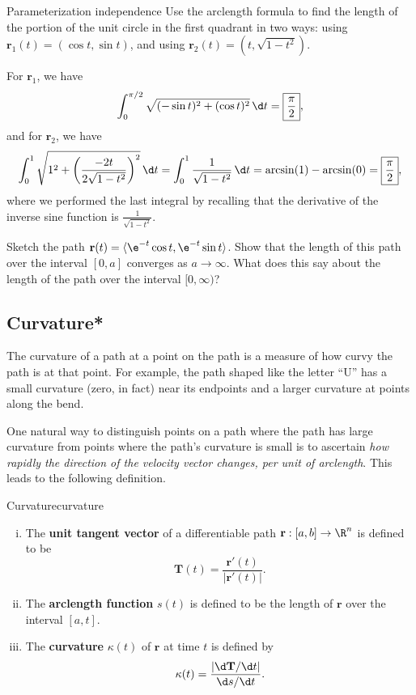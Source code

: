 \documentclass{watsonbook}
\begin{document}
\begin{example}{Parameterization independence}{}
  Use the arclength formula to find the length of the portion of the
  unit circle in the first quadrant in two ways: using $\mathbf{r}_1(t)
  = (\cos t, \sin t)$, and using $\mathbf{r}_2(t) = (t,\sqrt{1-t^2})$. 
\end{example}

\begin{solution}
  For $\mathbf{r}_1$, we have 
  \[
    \int_0^{\pi/2} \sqrt{(-\sin t)^2 + (\cos t)^2} \, \d t = \boxed{\frac{\pi}{2}}, 
  \]
  and for $\mathbf{r}_2$, we have
  \[
    \int_0^1 \sqrt{1^2 + \left(\frac{-2t}{2\sqrt{1-t^2}}\right)^2}\, \d
    t =  \int_0^1 \frac{1}{\sqrt{1-t^2}} \, \d t = \arcsin(1) -
    \arcsin(0) = \boxed{\frac{\pi}{2}}, 
  \]
  where we performed the last integral by recalling that the
  derivative of the inverse sine function is
  $\frac{1}{\sqrt{1-t^2}}$. 
\end{solution}

\begin{exercise}{}{}
  Sketch the path
  $\mathbf{r}(t) = \langle \e^{-t} \cos t, \e^{-t} \sin t \rangle$. Show
  that the length of this path over the interval $[0,a]$ converges as
  $a\to\infty$. What does this say about the length of the path over
  the interval $[0,\infty)$?
\end{exercise}

\subsection{Curvature*} 

The curvature of a path at a point on the path is a measure of how
curvy the path is at that point. For example, the path shaped like the
letter ``\textsf{U}'' has a small curvature (zero, in fact) near its
endpoints and a larger curvature at points along the bend.

One natural way to distinguish points on a path where the path has
large curvature from points where the path's curvature is small is to
ascertain \textit{how rapidly the direction of the velocity vector
  changes, per unit of arclength}. This leads to the following
definition.

\begin{defn}[breakable]{Curvature}{curvature}
  \begin{enumerate}[(i),leftmargin=12pt,topsep=-6pt,itemsep=4pt]
  \item The \textbf{unit tangent vector} of a differentiable path $\mathbf{r}:[a,b]
    \to \R^n$ is defined to be
    \[
      \mathbf{T}(t) = \frac{\mathbf{r}'(t)}{|\mathbf{r}'(t)|}. 
    \]
  \item The \textbf{arclength function} $s(t)$ is defined to be the length
    of $\mathbf{r}$ over the interval $[a,t]$.
  \item The \textbf{curvature} $\kappa(t)$ of $\mathbf{r}$ at time $t$ is
    defined by
    \[
      \mathbf{\kappa}(t) = \frac{|\d\mathbf{T}/\d t|}{\d s/\d t}. 
    \]
  \end{enumerate}
\end{defn}
\end{document}
